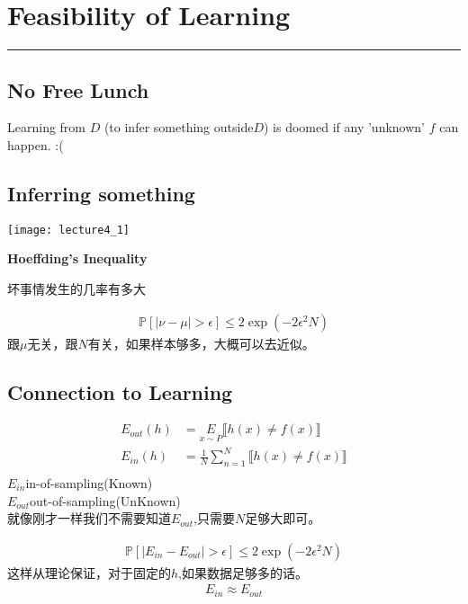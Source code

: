 \section{Feasibility of Learning}
\noindent
{\color{LightRubineRed} \rule{\linewidth}{1mm} }

\subsection{No Free Lunch}
Learning from $D$ (to infer something outside$D$) is doomed if any 'unknown' $f$ can happen. :( \par

\subsection{Inferring something} %
\begin{center}
\texttt{[image: lecture4\_1]}\\
\end{center}
\textbf{Hoeffding's Inequality} \par
坏事情发生的几率有多大 \par
\begin{align*}
\mathbb{P}[|\nu-\mu| > \epsilon] \leq 2\exp(-2\epsilon^2N)
\end{align*}
跟$\mu$无关，跟$N$有关，如果样本够多，大概可以去近似。 \par
\subsection{Connection to Learning} %
\begin{align*}
E_{out}(h) &= \underset{x \sim P}{E} \llbracket h(x) \neq f(x) \rrbracket\\
E_{in}(h) &= \frac{1}{N}\sum_{n=1}^N \llbracket h(x) \neq f(x) \rrbracket \\
\end{align*}
$E_{in}$in-of-sampling(Known) \\
$E_{out}$out-of-sampling(UnKnown) \\
就像刚才一样我们不需要知道$E_{out}$,只需要$N$足够大即可。\par
\begin{align*}
\mathbb{P}[|E_{in}-E_{out}| > \epsilon] \leq 2\exp(-2\epsilon^2N)
\end{align*}
这样从理论保证，对于固定的$h$,如果数据足够多的话。
\begin{align*}
	E_{in} \approx E_{out}
\end{align*}
